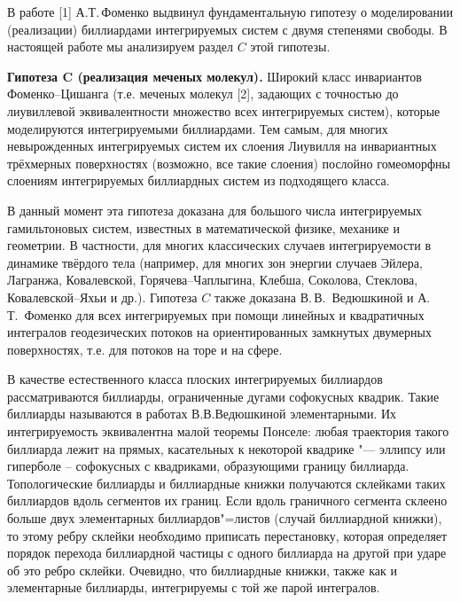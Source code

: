 \vzmscaption
В работе [1] А.Т.\,Фоменко выдвинул фундаментальную гипотезу о моделировании (реализации) биллиардами интегрируемых систем с двумя степенями свободы.
В настоящей работе мы анализируем раздел $C$ этой гипотезы.

\textbf{Гипотеза C (реализация меченых молекул).} Широкий класс инвариантов Фоменко--Цишанга (т.е. меченых молекул [2], задающих с точностью до лиувиллевой эквивалентности множество всех интегрируемых систем), которые моделируются интегрируемыми биллиардами. Тем самым, для многих невырожденных интегрируемых систем их слоения Лиувилля на инвариантных
трёхмерных поверхностях (возможно, все такие слоения) послойно гомеоморфны слоениям интегрируемых биллиардных систем из подходящего класса.

В данный момент эта гипотеза доказана для большого числа интегрируемых гамильтоновых систем, известных в математической физике, механике и геометрии. В частности, для многих классических случаев интегрируемости в динамике твёрдого тела (например, для многих зон энергии случаев Эйлера, Лагранжа, Ковалевской, Горячева--Чаплыгина, Клебша, Соколова, Стеклова, Ковалевской--Яхьи и др.). Гипотеза $C$ также доказана В.\,В.~Ведюшкиной и А.\,Т.~Фоменко для всех интегрируемых при помощи линейных и квадратичных интегралов геодезических потоков на ориентированных замкнутых двумерных поверхностях, т.е. для потоков на торе и на сфере.

 В качестве естественного класса плоских интегрируемых биллиардов рассматриваются биллиарды, ограниченные дугами софокусных квадрик. Такие биллиарды называются в работах В.В.Ведюшкиной элементарными. Их интегрируемость эквивалентна малой теоремы Понселе: любая траектория такого биллиарда лежит на прямых, касательных к некоторой квадрике "--- эллипсу или гиперболе -- софокусных с квадриками, образующими границу биллиарда. Топологические биллиарды и биллиардные книжки получаются склейками таких биллиардов вдоль сегментов их границ. Если вдоль граничного сегмента склеено больше двух элементарных биллиардов"=листов (случай биллиардной книжки), то этому ребру склейки необходимо приписать перестановку, которая определяет порядок перехода биллиардной частицы с одного биллиарда на другой при ударе об это ребро склейки. Очевидно, что биллиардные книжки, также как и элементарные биллиарды, интегрируемы с той же парой интегралов.

